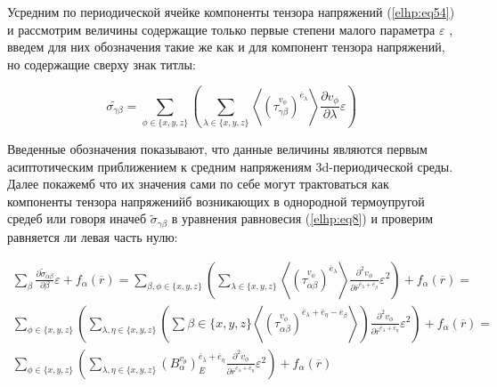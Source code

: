 Усредним по периодической ячейке компоненты тензора напряжений 
(\ref{elhp:eq54})
и
рассмотрим величины содержащие только первые степени малого параметра 
$\varepsilon$
, введем для
них обозначения такие же как и для компонент тензора напряжений, но содержащие сверху
знак титлы:

\begin{equation}
    \label{elhp:eq55}
    \widetilde{\sigma_{\gamma\beta}} =
    \sum_{ \phi \in \{x,y,z\} } 
    \left( 
        \sum_{ \lambda \in \{x,y,z\} }
        \left< 
        \left( \tau_{\gamma\beta}^{v_{\phi}} \right)^{ \overline{e}_{\lambda}} 
        \right> 
        \frac{ \partial v_{\phi}}{ \partial \lambda} \varepsilon
    \right) 
\end{equation}

Введенные обозначения показывают, что данные величины являются первым асиптотическим
приближением к средним напряжениям 3d-периодической среды. Далее
покажемб что их значения сами по себе могут трактоваться как компоненты тензора
напряженийб возникающих в однородной термоупругой средеб или говоря иначеб 
$ \widetilde{\sigma}_{\gamma\beta}$
в 
уравнения равновесия 
(\ref{elhp:eq8})
и проверим равняется ли левая часть нулю:

\begin{equation}
    \label{elhp:eq56}
    \begin{gathered}
        \sum_{\beta} \frac{ \partial \widetilde{\sigma}_{ \alpha\beta}} { \partial \beta}
            \varepsilon + f_{\alpha} \left( \overline{r}  \right) =
            \sum_{ \beta,\phi \in \{x,y,z\} }
    \left( 
        \sum_{ \lambda \in \{x,y,z\} }
        \left< 
        \left( \tau_{\alpha\beta}^{v_{\phi}} \right)^{ \overline{e}_{\lambda}} 
        \right> 
        \frac{ \partial^2 v_{\phi}}
        { \partial \overline{r}^{ \overline{e}_{\lambda} + \overline{e}_{\beta}} } \varepsilon^2
    \right) 
    + f_{\alpha} \left( \overline{r}  \right)
    = \\
            \sum_{\phi \in \{x,y,z\} }
    \left( 
        \sum_{ \lambda, \eta \in \{x,y,z\} }
        \left( 
            \sum{ \beta \in \{x,y,z\} }
        \left< 
        \left( \tau_{\alpha\beta}^{v_{\phi}} \right)^{\overline{e}_{\lambda} + \overline{e}_{\eta} - \overline{e}_{\beta}} 
        \right> 
        \right) 
        \frac{ \partial^2 v_{\phi}}
        { \partial \overline{r}^{ \overline{e}_{\lambda} + \overline{e}_{\eta}} } \varepsilon^2
    \right) 
    + f_{\alpha} \left( \overline{r}  \right)
    = \\
            \sum_{\phi \in \{x,y,z\} }
    \left( 
        \sum_{ \lambda, \eta \in \{x,y,z\} }
        \left( B_{\alpha}^{ v_{\theta}} \right)_E^{ \overline{e}_{\lambda} + \overline{e}_{\eta}} 
        \frac{ \partial^2 v_{\phi}}
        { \partial \overline{r}^{ \overline{e}_{\lambda} + \overline{e}_{\eta}} } \varepsilon^2
    \right) 
    + f_{\alpha} \left( \overline{r}  \right)
    \end{gathered}
\end{equation}


